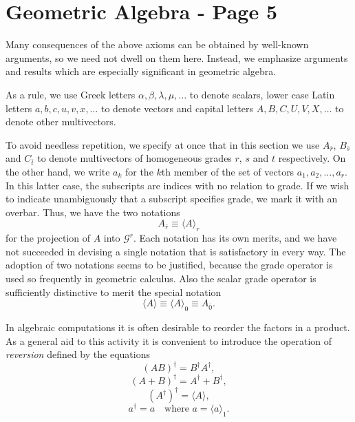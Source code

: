 \documentclass[fleqn]{scrartcl}
\numberwithin{equation}{section}
\begin{document}
\section*{Geometric Algebra - Page 5}

\noindent Many consequences of the above axioms can be obtained by well-known arguments, so we need not dwell on them here. Instead, we emphasize arguments and results which are especially significant in geometric algebra.

\vspace{1em}
\noindent As a rule, we use Greek letters \(\alpha, \beta, \lambda, \mu, \dots\) to denote scalars, lower case Latin letters \(a, b, c, u, v, x, \dots\) to denote vectors and capital letters \(A, B, C, U, V, X, \dots\) to denote other multivectors.

\vspace{1em}
\noindent To avoid needless repetition, we specify at once that in this section we use \(A_{\bar{r}}\), \(B_{\bar{s}}\) and \(C_{\bar{t}}\) to denote multivectors of homogeneous grades \(r\), \(s\) and \(t\) respectively. On the other hand, we write \(a_k\) for the \(k\)th member of the set of vectors \(a_1, a_2, \dots, a_r\). In this latter case, the subscripts are indices with no relation to grade. If we wish to indicate unambiguously that a subscript specifies grade, we mark it with an overbar. Thus, we have the two notations
\begin{equation}
A_{\bar{r}} \equiv \langle A \rangle_r \tag{1.15}
\end{equation}
for the projection of \(A\) into \(\mathscr{G}^r\). Each notation has its own merits, and we have not succeeded in devising a single notation that is satisfactory in every way. The adoption of two notations seems to be justified, because the grade operator is used so frequently in geometric calculus. Also the scalar grade operator is sufficiently distinctive to merit the special notation
\begin{equation}
\langle A \rangle \equiv \langle A \rangle_0 \equiv A_{\bar{0}}. \tag{1.16}
\end{equation}

\vspace{1em}
\noindent In algebraic computations it is often desirable to reorder the factors in a product. As a general aid to this activity it is convenient to introduce the operation of \textit{reversion} defined by the equations
\begin{equation}
(AB)^{\dagger} = B^{\dagger} A^{\dagger}, \tag{1.17a}
\end{equation}
\begin{equation}
(A + B)^{\dagger} = A^{\dagger} + B^{\dagger}, \tag{1.17b}
\end{equation}
\begin{equation}
(A^{\dagger})^{\dagger} = \langle A \rangle, \tag{1.17c}
\end{equation}
\begin{equation}
a^{\dagger} = a \quad \text{where } a = \langle a \rangle_1. \tag{1.17d}
\end{equation}
\end{document}
